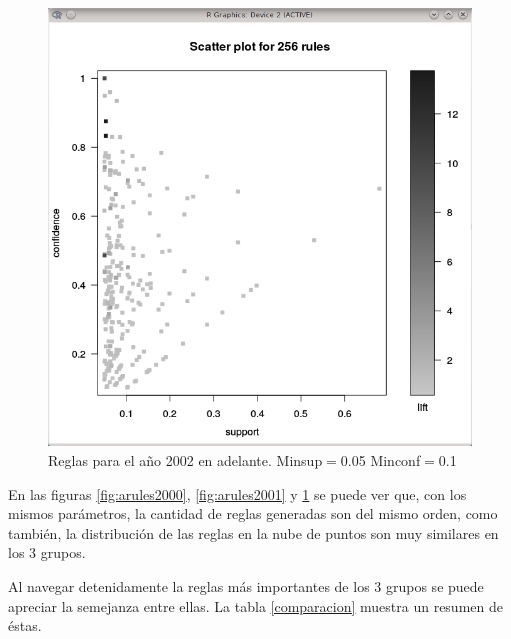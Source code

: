\documentclass[journal]{IEEEtran}
\begin{document}
\begin{figure}[ht!]
  \caption{Reglas para el año 2001. Minsup$=$0.05 Minconf$=$0.1}\label{fig:arules2001}
\endminipage\hfill
{}%
  \includegraphics[width=\linewidth]{2002.png}
  \caption{Reglas para el año 2002 en adelante. Minsup$=$0.05 Minconf$=$0.1}\label{fig:arules2002}
\endminipage
\end{figure}

En las figuras \ref{fig:arules2000}, \ref{fig:arules2001} y \ref{fig:arules2002} 
se puede ver que, con los mismos parámetros, la cantidad de reglas
generadas son del mismo orden, como también, la distribución de las reglas
en la nube de puntos son muy similares en los 3 grupos.

Al navegar detenidamente la reglas más importantes de los 3 grupos 
se puede apreciar la semejanza
entre ellas. La tabla \ref{comparacion} muestra un resumen de éstas.
\end{document}
